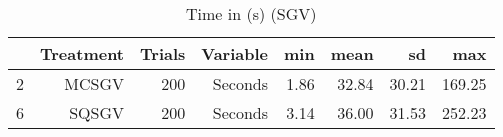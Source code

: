\begin{table}[ht]
\centering
\begin{tabular}{rrrrrrrr}
  \hline
 & Treatment & Trials & Variable & min & mean & sd & max \\ 
  \hline
2 & MCSGV & 200 & Seconds & 1.86 & 32.84 & 30.21 & 169.25 \\ 
  6 & SQSGV & 200 & Seconds & 3.14 & 36.00 & 31.53 & 252.23 \\ 
   \hline
\end{tabular}
\caption{Time in (s) (SGV)} 
\end{table}
